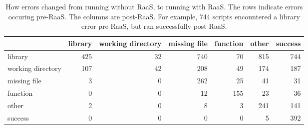 \begin{table}
\centering
\caption{How errors changed from running without RaaS, to running with RaaS. The rows indicate errors occuring pre-RaaS. The columns are post-RaaS. For example, 744 scripts encountered a library error pre-RaaS, but ran successfully post-RaaS.}
\begin{tabular}{lrrrrrr}
\toprule
{} &  library &  working directory &  missing file &  function &  other &  success \\
\midrule
library           &      425 &                 32 &           740 &        70 &    815 &      744 \\ \hline
working directory &      107 &                 42 &           208 &        49 &    174 &      187 \\ \hline
missing file      &        3 &                  0 &           262 &        25 &     41 &       31 \\ \hline
function          &        0 &                  0 &            12 &       155 &     23 &       36 \\ \hline
other             &        2 &                  0 &             8 &         3 &    241 &      141 \\ \hline
success           &        0 &                  0 &             0 &         0 &      5 &      392 \\
\bottomrule
\end{tabular}
\end{table}
